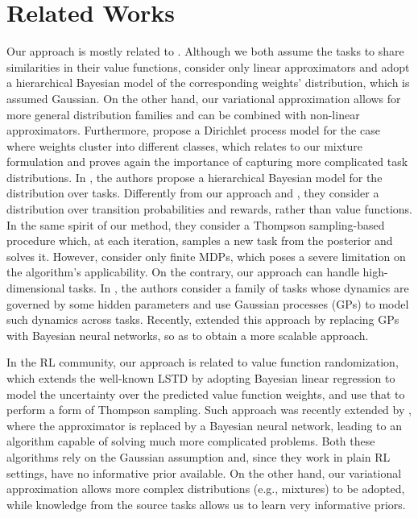 \documentclass{article}
\begin{document}
\section{Related Works}

Our approach is mostly related to \cite{lazaric2010bayesian}. Although we both assume the tasks to share similarities in their value functions, \cite{lazaric2010bayesian} consider only linear approximators and adopt a hierarchical Bayesian model of the corresponding weights' distribution, which is assumed Gaussian. On the other hand, our variational approximation allows for more general distribution families and can be combined with non-linear approximators. Furthermore, \cite{lazaric2010bayesian} propose a Dirichlet process model for the case where weights cluster into different classes, which relates to our mixture formulation and proves again the importance of capturing more complicated task distributions. In \cite{wilson2007multi}, the authors propose a hierarchical Bayesian model for the distribution over tasks. Differently from our approach and \cite{lazaric2010bayesian}, they consider a distribution over transition probabilities and rewards, rather than value functions. In the same spirit of our method, they consider a Thompson sampling-based procedure which, at each iteration, samples a new task from the posterior and solves it. However, \cite{wilson2007multi} consider only finite MDPs, which poses a severe limitation on the algorithm's applicability. On the contrary, our approach can handle high-dimensional tasks. In \cite{doshi2016hidden}, the authors consider a family of tasks whose dynamics are governed by some hidden parameters and use Gaussian processes (GPs) to model such dynamics across tasks. Recently, \cite{killian2017robust} extended this approach by replacing GPs with Bayesian neural networks, so as to obtain a more scalable approach.

In the RL community, our approach is related to value function randomization\cite{osband2014generalization}, which extends the well-known LSTD \cite{boyan1999least} by adopting Bayesian linear regression to model the uncertainty over the predicted value function weights, and use that to perform a form of Thompson sampling. Such approach was recently extended by \cite{azizzadenesheli2018efficient}, where the approximator is replaced by a Bayesian neural network, leading to an algorithm capable of solving much more complicated problems. Both these algorithms rely on the Gaussian assumption and, since they work in plain RL settings, have no informative prior available. On the other hand, our variational approximation allows more complex distributions (e.g., mixtures) to be adopted, while knowledge from the source tasks allows us to learn very informative priors.
\end{document}

